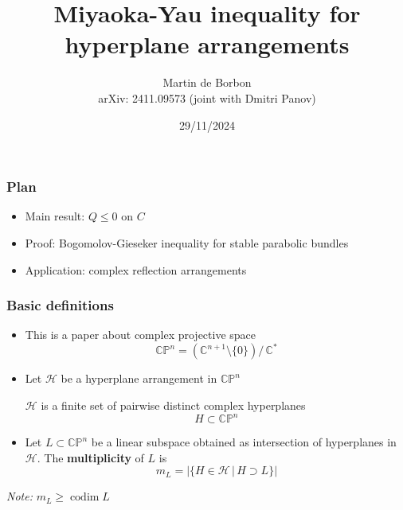 \documentclass{beamer}
\title[]{Miyaoka-Yau inequality for hyperplane arrangements}
\author[Integrable Day at Loughborough]{Martin de Borbon \\
arXiv: 2411.09573 (joint with Dmitri Panov)}
\institute[]{Loughborough University}
\date{29/11/2024}
\newcommand{\C}{\mathbb{C}}
\newcommand{\CP}{\mathbb{CP}}
\newcommand{\mH}{\mathcal{H}}
\DeclareMathOperator{\codim}{codim}
\begin{document}
\begin{frame}
	\maketitle
\end{frame}




\begin{frame}
	\frametitle{Plan}
	\begin{itemize}
		\pause
		\item Main result: \pause \(Q \leq 0\) on \(C\)
		\vfill
		\pause
		\item Proof: \pause Bogomolov-Gieseker inequality for stable parabolic bundles
		\vfill
		\pause
		\item Application: \pause complex reflection arrangements
	\end{itemize}
\end{frame}


\begin{frame}
	\frametitle{Basic definitions}
	\begin{itemize}
		\pause
		\item This is a paper about complex projective space
		\begin{equation*}
			\CP^n = \left(\C^{n+1} \setminus \{0\}\right) \big/ \, \C^*	
		\end{equation*} 
		\vfill
		
		\pause
		\item Let \(\mH\) be a hyperplane arrangement in \(\CP^n\)
		
		\(\mH\) is a finite set of pairwise distinct complex hyperplanes 
		\[
		H \subset \CP^n 
		\]
		\vfill
		
		\pause
		\item Let \(L \subset \CP^n\) be a linear subspace  obtained as intersection of hyperplanes in \(\mH\). 
		The \textbf{multiplicity} of \(L\) is
		\[
		m_L = \big| \{H \in \mH \,|\, H \supset L\} \big| 
		\]
	\end{itemize}
	
\emph{Note:} \(m_L \geq \codim L\)
\end{frame}
\end{document}
